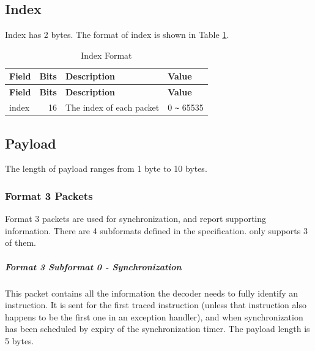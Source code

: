\documentclass[main\_\_EN.tex]{subfiles}
\begin{document}
\subsection{Index}

Index has 2 bytes. The format of index is shown in Table \ref{tab:index}.

\begin{longtable}[c]{ |l|r|l|l| }
    \caption{Index Format}
    \label{tab:index}
    \\\hline\rowcolor{lightgray}
    \textbf{Field} & \textbf{Bits} & \textbf{Description} & \textbf{Value}\\\hline
    \endfirsthead
    \textbf{Field} & \textbf{Bits} & \textbf{Description} & \textbf{Value}\\\hline
    \endhead
    \endfoot
    \endlastfoot

    index & 16 & The index of each packet & 0 \verb+~+ 65535  \\\hline
 \end{longtable}

\subsection{Payload}

The length of payload ranges from 1 byte to 10 bytes.

\subsubsection{Format 3 Packets}

Format 3 packets are used for synchronization, and report supporting information. There are 4 subformats defined in the specification. \chipname{} only supports 3 of them.

\subparagraph{Format 3 Subformat 0 - Synchronization}\label{sec:riscvtracenc-format-3-sub-0}

This packet contains all the information the decoder needs to fully identify an instruction. It is sent for the first traced instruction (unless that instruction also happens to be the first one in an exception handler), and when synchronization has been scheduled by expiry of the synchronization timer. The payload length is 5 bytes.
\end{document}

